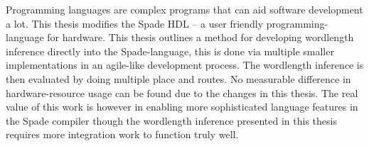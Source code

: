 Programming languages are complex programs that can aid software development a lot. This thesis modifies the Spade HDL -- a user friendly programming-language for hardware. This thesis outlines a method for developing wordlength inference directly into the Spade-language, this is done via multiple smaller implementations in an agile-like development process. The wordlength inference is then evaluated by doing multiple place and routes. No measurable difference in hardware-resource usage can be found due to the changes in this thesis. The real value of this work is however in enabling more sophisticated language features in the Spade compiler though the wordlength inference presented in this thesis requires more integration work to function truly well.
